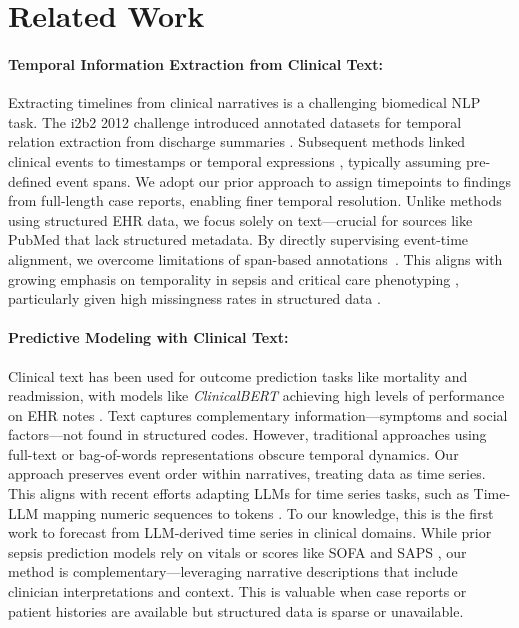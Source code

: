 \documentclass[letterpaper]{article} %
\begin{document}
\section{Related Work}

\paragraph{Temporal Information Extraction from Clinical Text:}
Extracting timelines from clinical narratives is a challenging biomedical NLP task. The i2b2 2012 challenge introduced annotated datasets for temporal relation extraction from discharge summaries \citep{uzuner20112010}. Subsequent methods linked clinical events to timestamps or temporal expressions \citep{leeuwenberg2020towards, frattallone2024using}, typically assuming pre-defined event spans. We adopt our prior approach \citep{noroozizadeh2025reconstructing, noroozizadeh2025pmoa} to assign timepoints to findings from full-length case reports, enabling finer temporal resolution. Unlike methods using structured EHR data, we focus solely on text—crucial for sources like PubMed that lack structured metadata. By directly supervising event-time alignment, we overcome limitations of span-based annotations~\citep{rosenbloom2011data}. This aligns with growing emphasis on temporality in sepsis and critical care phenotyping \citep{johnson2018comparative, kamran2024evaluation}, particularly given high missingness rates in structured data \citep{johnson2023mimic,seinen2025using}.

\paragraph{Predictive Modeling with Clinical Text:}
Clinical text has been used for outcome prediction tasks like mortality and readmission, with models like \textit{ClinicalBERT} achieving high levels of performance on EHR notes \citep{huang2019clinicalbert, gu2021domain}. 
Text captures complementary information—symptoms and social factors—not found in structured codes. 
However, traditional approaches using full-text or bag-of-words representations obscure temporal dynamics. 
Our approach preserves event order within narratives, treating data as time series. This aligns with recent efforts adapting LLMs for time series tasks, such as Time-LLM mapping numeric sequences to tokens \citep{jin2023time}. 
To our knowledge, this is the first work to forecast from LLM-derived time series in clinical domains. 
While prior sepsis prediction models rely on vitals or scores like SOFA and SAPS \citep{hou2020predicting, noroozizadeh2023temporal}, our method is complementary—leveraging narrative descriptions that include clinician interpretations and context. 
This is valuable when case reports or patient histories are available but structured data is sparse or unavailable.
\end{document}
